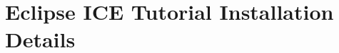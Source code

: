 \documentclass{article}
\begin{document}
\section*{Eclipse ICE Tutorial Installation Details}
\end{document}
